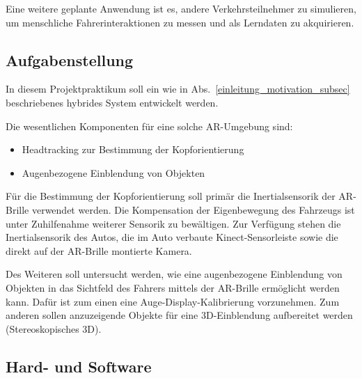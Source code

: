 Eine weitere geplante Anwendung ist es, andere Verkehrsteilnehmer zu simulieren, um menschliche Fahrerinteraktionen zu messen und als Lerndaten zu akquirieren. 



\subsection{Aufgabenstellung}
\label{einleitung_aufgabenstellung_subsec}


In diesem Projektpraktikum soll ein wie in Abs.~\ref{einleitung_motivation_subsec} beschriebenes hybrides System entwickelt werden.

Die wesentlichen Komponenten für eine solche \ac{AR}-Umgebung sind:
\begin{itemize}
  \item Headtracking zur Bestimmung der Kopforientierung
  \item Augenbezogene Einblendung von Objekten
\end{itemize}

Für die Bestimmung der Kopforientierung soll primär die Inertialsensorik der \ac{AR}-Brille verwendet werden.
Die Kompensation der Eigenbewegung des Fahrzeugs ist unter Zuhilfenahme weiterer Sensorik zu bewältigen.
Zur Verfügung stehen die Inertialsensorik des Autos, die im Auto verbaute Kinect-Sensorleiste sowie die direkt auf der \ac{AR}-Brille montierte Kamera.

Des Weiteren soll untersucht werden, wie eine augenbezogene Einblendung von Objekten in das Sichtfeld des Fahrers mittels der \ac{AR}-Brille ermöglicht werden kann.
Dafür ist zum einen eine Auge-Display-Kalibrierung vorzunehmen.
Zum anderen sollen anzuzeigende Objekte für eine 3D-Einblendung aufbereitet werden (Stereoskopisches 3D).


\subsection{Hard- und Software}
\label{einleitung_hardware_subsec}

